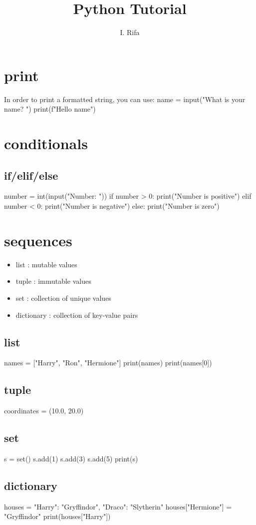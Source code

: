 \documentclass[12pt]{article}
\title{Python Tutorial}
\author{I. Rifa}
\begin{document}
\maketitle

\section{print}

In order to print a formatted string, you can use:
name = input("What is your name? ")
print(f"Hello {name}")

\section{conditionals}
\subsection{if/elif/else}
number = int(input("Number: "))
if number > 0:
    print("Number is positive")
elif number < 0:
    print("Number is negative")
else:
    print("Number is zero")

\section{sequences}
\begin{itemize}
    \item list : mutable values
    \item tuple : immutable values
    \item set : collection of unique values
    \item dictionary : collection of key-value pairs
\end{itemize}

\subsection{list}
names = ["Harry", "Ron", "Hermione"]
print(names)
print(names[0])
\subsection{tuple}
coordinates = (10.0, 20.0)
\subsection{set}
s = set()
s.add(1)
s.add(3)
s.add(5)
print(s)

\subsection{dictionary}
houses = {"Harry": "Gryffindor", "Draco": "Slytherin"}
houses["Hermione"] = "Gryffindor"
print(houses["Harry"])
\end{document}
